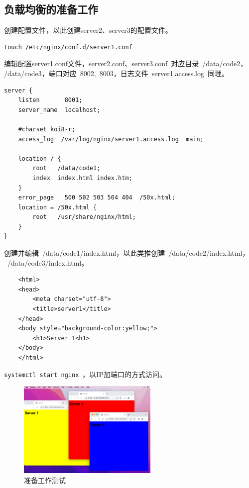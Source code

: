\documentclass[12pt, a4paper]{article} %
\begin{document}
\begin{CJK*}{UTF8}{gbsn}
\subsection{负载均衡的准备工作}

创建配置文件，以此创建server2、server3的配置文件。
\begin{lstlisting}
touch /etc/nginx/conf.d/server1.conf
\end{lstlisting}

编辑配置server1.conf文件，server2.conf、server3.conf~对应目录~/data/code2，\\
/data/code3，端口对应~8002,~8003，日志文件~server1.access.log~同理。
\begin{lstlisting}
server {
    listen       8001;
    server_name  localhost;

    #charset koi8-r;
    access_log  /var/log/nginx/server1.access.log  main;

    location / {
        root   /data/code1;
        index  index.html index.htm;
    }
    error_page   500 502 503 504 404  /50x.html;
    location = /50x.html {
        root   /usr/share/nginx/html;
    }
}
\end{lstlisting}

创建并编辑~/data/code1/index.html，以此类推创建~/data/code2/index.html，\\
~/data/code3/index.html。
\begin{verbatim}
    <html>
    <head>
        <meta charset="utf-8">
        <title>server1</title>
    </head>
    <body style="background-color:yellow;">
        <h1>Server 1<h1>
    </body>
    </html>
\end{verbatim}

\verb|systemctl start nginx|~，以IP加端口的方式访问。

\begin{figure}[htbp]
    \centering
    \includegraphics[width=0.6\textwidth]{./imgs/catch2023-08-26-10.43.17.png}
    \caption{准备工作测试}
\end{figure}


\end{CJK*}
\end{document}
